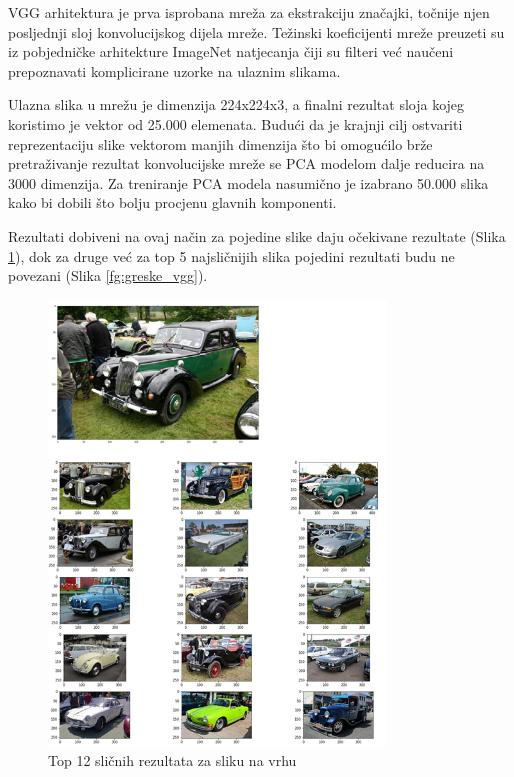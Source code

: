\documentclass[times, utf8, proizvoljni, numeric]{fer}
\begin{document}
VGG arhitektura je prva isprobana mreža za ekstrakciju značajki, točnije njen posljednji sloj konvolucijskog dijela mreže. Težinski koeficijenti mreže preuzeti su iz pobjedničke arhitekture ImageNet natjecanja čiji su filteri već naučeni prepoznavati komplicirane uzorke na ulaznim slikama.

Ulazna slika u mrežu je dimenzija 224x224x3, a finalni rezultat sloja kojeg koristimo je vektor od 25.000 elemenata. Budući da je krajnji cilj ostvariti reprezentaciju slike vektorom manjih dimenzija što bi omogućilo brže pretraživanje rezultat konvolucijske mreže se PCA modelom dalje reducira na 3000 dimenzija. Za treniranje PCA modela nasumično je izabrano 50.000 slika kako bi dobili što bolju procjenu glavnih komponenti.

Rezultati dobiveni na ovaj način za pojedine slike daju očekivane rezultate  (Slika \ref{fg:auti_vgg}), dok za druge već za top 5 najsličnijih slika pojedini rezultati budu ne povezani (Slika \ref{fg:greske_vgg}). 

\begin{figure}[!ht]
	\begin{center}
		\captionsetup{justification=centering}
		\includegraphics[width=0.8\textwidth]{./imgs/auti_vgg.png}
		\caption{Top 12 sličnih rezultata za sliku na vrhu}
		\label{fg:auti_vgg}
	\end{center}
\end{figure}
\end{document}
